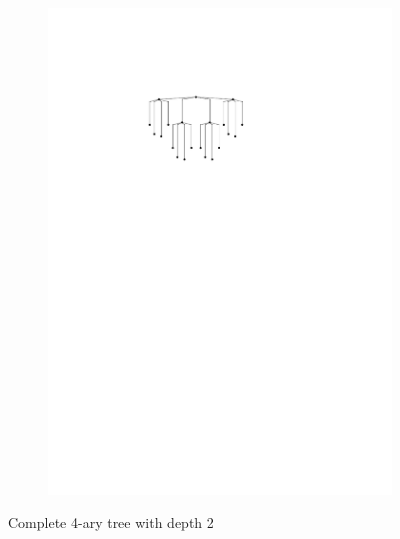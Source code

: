 \begin{figure}[H]
	\centering
	\begin{subfigure}{0.8\linewidth}
		\centering
		\includegraphics[width=\textwidth,page=1]{drawings/4-ary_tree.pdf}
	\end{subfigure}
	\caption{Complete 4-ary tree with depth 2}\label{im:4-ary_d=2}
\end{figure}

